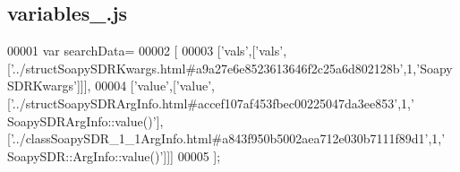 \subsection{variables\+\_.\+js}
\label{variables__9_8js_source}

\begin{DoxyCode}
00001 var searchData=
00002 [
00003   [\textcolor{stringliteral}{'vals'},[\textcolor{stringliteral}{'vals'},[\textcolor{stringliteral}{'../structSoapySDRKwargs.html#a9a27e6e8523613646f2c25a6d802128b'},1,\textcolor{stringliteral}{'SoapySDRKwargs'}]]],
00004   [\textcolor{stringliteral}{'value'},[\textcolor{stringliteral}{'value'},[\textcolor{stringliteral}{'../structSoapySDRArgInfo.html#accef107af453fbec00225047da3ee853'},1,\textcolor{stringliteral}{'
      SoapySDRArgInfo::value()'}],[\textcolor{stringliteral}{'../classSoapySDR\_1\_1ArgInfo.html#a843f950b5002aea712e030b7111f89d1'},1,\textcolor{stringliteral}{'
      SoapySDR::ArgInfo::value()'}]]]
00005 ];
\end{DoxyCode}
